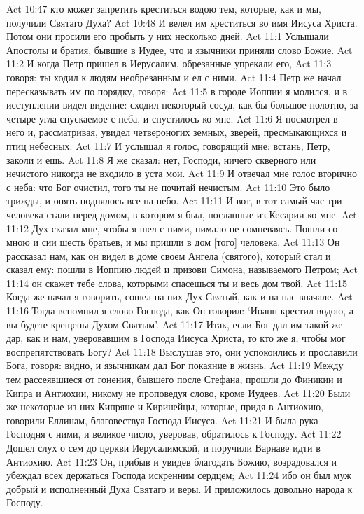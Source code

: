 Act 10:47  кто может запретить креститься водою тем, которые, как и мы, получили Святаго Духа?
Act 10:48  И велел им креститься во имя Иисуса Христа. Потом они просили его пробыть у них несколько дней.
Act 11:1  Услышали Апостолы и братия, бывшие в Иудее, что и язычники приняли слово Божие.
Act 11:2  И когда Петр пришел в Иерусалим, обрезанные упрекали его,
Act 11:3  говоря: ты ходил к людям необрезанным и ел с ними.
Act 11:4  Петр же начал пересказывать им по порядку, говоря:
Act 11:5  в городе Иоппии я молился, и в исступлении видел видение: сходил некоторый сосуд, как бы большое полотно, за четыре угла спускаемое с неба, и спустилось ко мне.
Act 11:6  Я посмотрел в него и, рассматривая, увидел четвероногих земных, зверей, пресмыкающихся и птиц небесных.
Act 11:7  И услышал я голос, говорящий мне: встань, Петр, заколи и ешь.
Act 11:8  Я же сказал: нет, Господи, ничего скверного или нечистого никогда не входило в уста мои.
Act 11:9  И отвечал мне голос вторично с неба: что Бог очистил, того ты не почитай нечистым.
Act 11:10  Это было трижды, и опять поднялось все на небо.
Act 11:11  И вот, в тот самый час три человека стали перед домом, в котором я был, посланные из Кесарии ко мне.
Act 11:12  Дух сказал мне, чтобы я шел с ними, нимало не сомневаясь. Пошли со мною и сии шесть братьев, и мы пришли в дом [того] человека.
Act 11:13  Он рассказал нам, как он видел в доме своем Ангела (святого), который стал и сказал ему: пошли в Иоппию людей и призови Симона, называемого Петром;
Act 11:14  он скажет тебе слова, которыми спасешься ты и весь дом твой.
Act 11:15  Когда же начал я говорить, сошел на них Дух Святый, как и на нас вначале.
Act 11:16  Тогда вспомнил я слово Господа, как Он говорил: `Иоанн крестил водою, а вы будете крещены Духом Святым'.
Act 11:17  Итак, если Бог дал им такой же дар, как и нам, уверовавшим в Господа Иисуса Христа, то кто же я, чтобы мог воспрепятствовать Богу?
Act 11:18  Выслушав это, они успокоились и прославили Бога, говоря: видно, и язычникам дал Бог покаяние в жизнь.
Act 11:19  Между тем рассеявшиеся от гонения, бывшего после Стефана, прошли до Финикии и Кипра и Антиохии, никому не проповедуя слово, кроме Иудеев.
Act 11:20  Были же некоторые из них Кипряне и Киринейцы, которые, придя в Антиохию, говорили Еллинам, благовествуя Господа Иисуса.
Act 11:21  И была рука Господня с ними, и великое число, уверовав, обратилось к Господу.
Act 11:22  Дошел слух о сем до церкви Иерусалимской, и поручили Варнаве идти в Антиохию.
Act 11:23  Он, прибыв и увидев благодать Божию, возрадовался и убеждал всех держаться Господа искренним сердцем;
Act 11:24  ибо он был муж добрый и исполненный Духа Святаго и веры. И приложилось довольно народа к Господу.
